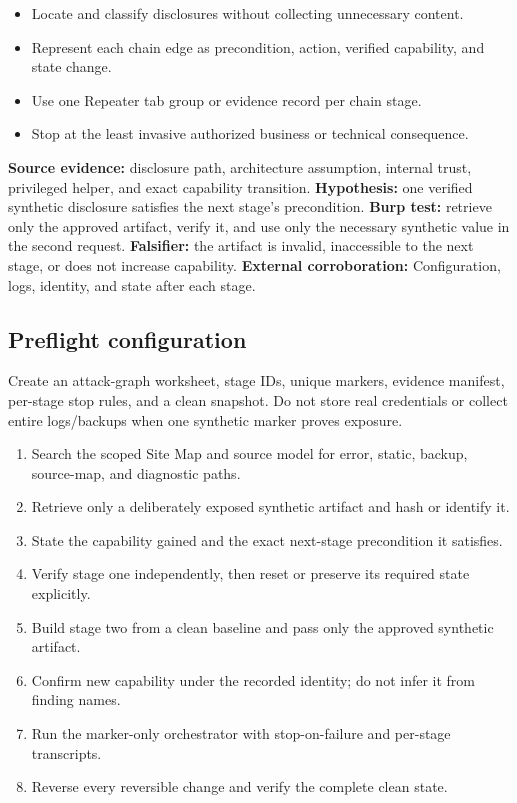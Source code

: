 \documentclass[11pt]{article}
\newcommand{\weekfield}[2]{%
  \Needspace{5\baselineskip}
  \subsection*{#1}
  #2
}
\newcommand{\externalproof}[1]{\textbf{External corroboration:} #1}
\begin{document}
\begin{objectivebox}
\begin{itemize}
  \item Locate and classify disclosures without collecting unnecessary content.
  \item Represent each chain edge as precondition, action, verified capability, and state change.
  \item Use one Repeater tab group or evidence record per chain stage.
  \item Stop at the least invasive authorized business or technical consequence.
\end{itemize}
\end{objectivebox}

\begin{bridgebox}
\textbf{Source evidence:} disclosure path, architecture assumption, internal
trust, privileged helper, and exact capability transition. \textbf{Hypothesis:}
one verified synthetic disclosure satisfies the next stage's precondition.
\textbf{Burp test:} retrieve only the approved artifact, verify it, and use only
the necessary synthetic value in the second request. \textbf{Falsifier:} the
artifact is invalid, inaccessible to the next stage, or does not increase
capability. \externalproof{Configuration, logs, identity, and state after each
stage.}
\end{bridgebox}

\weekfield{Preflight configuration}{Create an attack-graph worksheet, stage IDs,
unique markers, evidence manifest, per-stage stop rules, and a clean snapshot.
Do not store real credentials or collect entire logs/backups when one synthetic
marker proves exposure.}

\begin{procedurebox}
\begin{enumerate}
  \item Search the scoped Site Map and source model for error, static, backup, source-map, and diagnostic paths.
  \item Retrieve only a deliberately exposed synthetic artifact and hash or identify it.
  \item State the capability gained and the exact next-stage precondition it satisfies.
  \item Verify stage one independently, then reset or preserve its required state explicitly.
  \item Build stage two from a clean baseline and pass only the approved synthetic artifact.
  \item Confirm new capability under the recorded identity; do not infer it from finding names.
  \item Run the marker-only orchestrator with stop-on-failure and per-stage transcripts.
  \item Reverse every reversible change and verify the complete clean state.
\end{enumerate}
\end{procedurebox}
\end{document}
